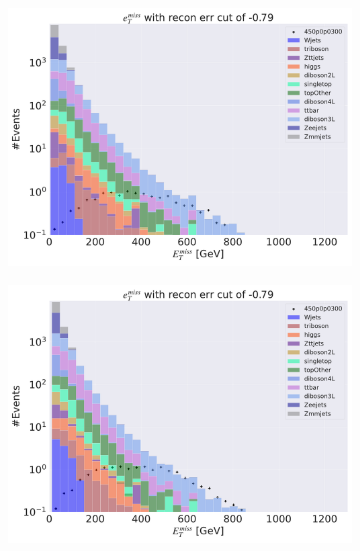 \begin{figure}[H]
    \centering
    \begin{subfigure}{.45\textwidth}
        \includegraphics[width=\textwidth]{Figures/VAE_testing/big/3lep/b_data_recon_big_rm3_feats_sig_450p0p0300_etmiss_recon_errcut_-0.79.pdf}
        \caption{ }
        \label{fig:VAE_3lep_big_450_cut_etmiss}
    \end{subfigure}
    \hfill
    \begin{subfigure}{.45\textwidth}
        \includegraphics[width=\textwidth]{Figures/VAE_testing/small/3lep/b_data_recon_big_rm3_feats_sig_450p0p0300_etmiss_recon_errcut_-0.79.pdf}
        \caption{}
        \label{fig:VAE_3lep_small_450_cut_etmiss}
    \end{subfigure}

\end{figure}
